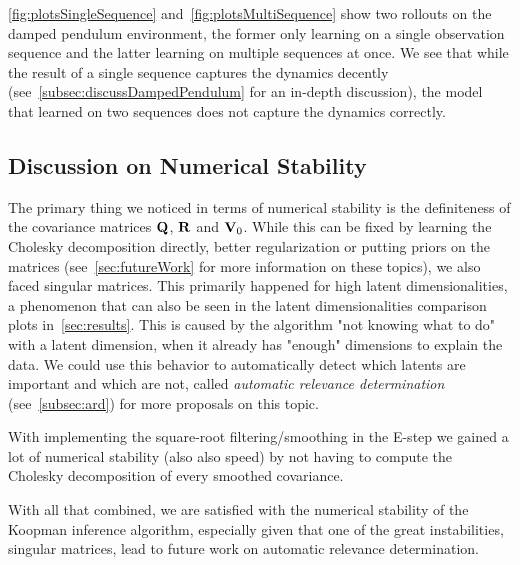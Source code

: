 		\autoref{fig:plotsSingleSequence} and~\autoref{fig:plotsMultiSequence} show two rollouts on the damped pendulum environment, the former only learning on a single observation sequence and the latter learning on multiple sequences at once. We see that while the result of a single sequence captures the dynamics decently (see~\autoref{subsec:discussDampedPendulum} for an in-depth discussion), the model that learned on two sequences does not capture the dynamics correctly.

	\subsection{Discussion on Numerical Stability}
		\label{subsec:discussPerformanceNumerics}

		The primary thing we noticed in terms of numerical stability is the definiteness of the covariance matrices \(\boldsymbol{\mathrm{Q}}\), \(\boldsymbol{\mathrm{R}}\) and \(\boldsymbol{\mathrm{V}}_0\). While this can be fixed by learning the Cholesky decomposition directly, better regularization or putting priors on the matrices (see~\autoref{sec:futureWork} for more information on these topics), we also faced singular matrices. This primarily happened for high latent dimensionalities, a phenomenon that can also be seen in the latent dimensionalities comparison plots in~\autoref{sec:results}. This is caused by the algorithm "not knowing what to do" with a latent dimension, \ie when it already has "enough" dimensions to explain the data. We could use this behavior to automatically detect which latents are important and which are not, called \emph{automatic relevance determination} (see~\autoref{subsec:ard}) for more proposals on this topic.

		With implementing the square-root filtering/smoothing in the E-step we gained a lot of numerical stability (also also speed) by not having to compute the Cholesky decomposition of every smoothed covariance.

		With all that combined, we are satisfied with the numerical stability of the Koopman inference algorithm, especially given that one of the great instabilities, singular matrices, lead to future work on automatic relevance determination.

